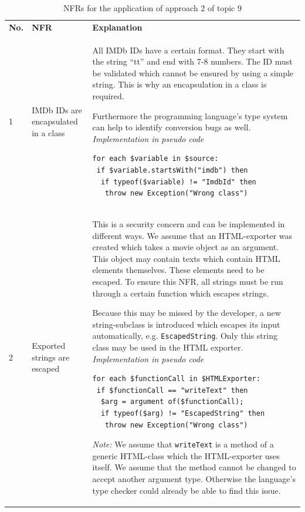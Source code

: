 \begin{longtable}[th]{p{}|p{}|p{}}
	\caption{NFRs for the application of approach 2 of topic 9}
	\label{tbl:topic_9_approach_2_nfr}
	\setlength{\tabcolsep}{1em} \\
	\hline    %
	\textbf{No.} & \textbf{NFR} & \textbf{Explanation} \\
	\hline
	1 & IMDb IDs are encapsulated in a class &
	All IMDb IDs have a certain format. They start with the string \enquote{tt} and end with 7-8 numbers. The ID must be validated which cannot be ensured by using a simple string. This is why an encapsulation in a class is required.
	
	Furthermore the programming language's type system can help to identify conversion bugs as well.
	\newline \newline \textit{Implementation in pseudo code}
	\begin{lstlisting}
for each $variable in $source:
 if $variable.startsWith("imdb") then
  if typeof($variable) != "ImdbId" then
   throw new Exception("Wrong class")
	\end{lstlisting}\\
	\hline
	
	2 & Exported strings are escaped &
	This is a security concern and can be implemented in different ways. We assume that an HTML-exporter was created which takes a movie object as an argument.
	This object may contain texts which contain HTML elements themselves.
	These elements need to be escaped. To ensure this NFR, all strings must be run through a certain function which escapes strings.
	
	Because this may be missed by the developer, a new string-subclass is introduced which escapes its input automatically, e.g. \texttt{EscapedString}.
	Only this string class may be used in the HTML exporter.
	\newline \newline \textit{Implementation in pseudo code}
	
	\begin{lstlisting}
for each $functionCall in $HTMLExporter:
 if $functionCall == "writeText" then
  $arg = argument of($functionCall);
  if typeof($arg) != "EscapedString" then
   throw new Exception("Wrong class")
	\end{lstlisting}

\textit{Note:} We assume that \texttt{writeText} is a method of a generic HTML-class which the HTML-exporter uses itself. We assume that the method cannot be changed to accept another argument type. Otherwise the language's type checker could already be able to find this issue.\\

\hline
\end{longtable}


